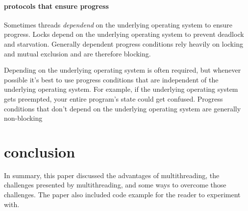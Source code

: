 \documentclass[titlepage]{article}
\begin{document}
\paragraph{protocols that ensure progress}

Sometimes threads \textit{dependend} on the underlying operating system to ensure progress. Locks depend on the underlying operating system to prevent deadlock and starvation. Generally dependent progress conditions rely heavily on locking and mutual exclusion and are therefore blocking.

Depending on the underlying operating system is often required, but whenever possible it's best to use progress conditions that are independent of the underlying operating system. For example, if the underlying operating system gets preempted, your entire program's state could get confused. Progress conditions that don't depend on the underlying operating system are generally non-blocking

\section{conclusion}

In summary, this paper discussed the advantages of multithreading, the challenges presented by multithreading, and some ways to overcome those challenges. The paper also included code example for the reader to experiment with.


\begin{singlespace}


\newpage
\nocite{*}
\printbibliography
\end{singlespace}
\end{document}
